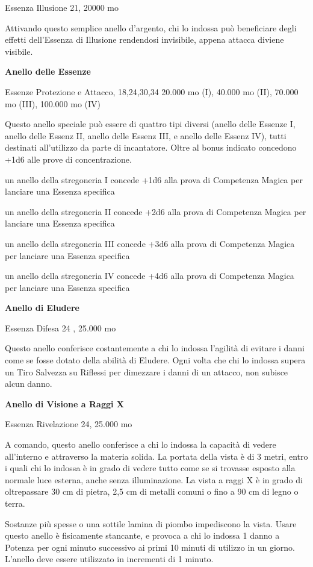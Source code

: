 \documentclass[a4paper,11pt,twoside,openany]{book}
\begin{document}
{Essenza Illusione 21, 20000 mo

Attivando questo semplice anello d'argento, chi lo indossa può beneficiare degli effetti dell'Essenza di Illusione rendendosi invisibile, appena attacca diviene visibile.

\textbf{Anello delle Essenze}

Essenze Protezione e Attacco, 18,24,30,34 20.000 mo (I), 40.000 mo
(II), 70.000 mo (III), 100.000 mo (IV)

Questo anello speciale può essere di quattro tipi diversi (anello delle Essenze I, anello delle Essenz II, anello delle Essenz III, e anello delle Essenz IV), tutti destinati all'utilizzo da parte di incantatore. Oltre al bonus indicato concedono +1d6 alle prove di concentrazione.

un anello della stregoneria I concede +1d6 alla prova di Competenza Magica per lanciare una Essenza specifica

un anello della stregoneria II concede +2d6 alla prova di Competenza Magica per lanciare una Essenza specifica

un anello della stregoneria III concede +3d6 alla prova di Competenza Magica per lanciare una Essenza specifica

un anello della stregoneria IV concede +4d6 alla prova di Competenza Magica per lanciare una Essenza specifica

\textbf{Anello di Eludere}

Essenza Difesa 24 , 25.000 mo

Questo anello conferisce costantemente a chi lo indossa l'agilità di evitare i danni come se fosse dotato della abilità di Eludere. Ogni volta che chi lo indossa supera un Tiro Salvezza su Riflessi per dimezzare i danni di un attacco, non subisce alcun danno. 

\textbf{Anello di Visione a Raggi X}

Essenza Rivelazione 24, 25.000 mo

A comando, questo anello conferisce a chi lo indossa la capacità di vedere all'interno e attraverso la materia solida. La portata della vista è di 3 metri, entro i quali chi lo indossa è in grado di vedere tutto come se si trovasse esposto alla normale luce esterna, anche senza illuminazione. La vista a raggi X è in grado di oltrepassare 30 cm di pietra, 2,5 cm di metalli comuni o fino a 90 cm di legno o terra.

Sostanze più spesse o una sottile lamina di piombo impediscono la vista. Usare questo anello è fisicamente stancante, e provoca a chi lo indossa 1 danno a Potenza per ogni minuto successivo ai primi 10 minuti di utilizzo in un giorno. L'anello deve essere utilizzato in incrementi di 1 minuto.

}
\end{document}
